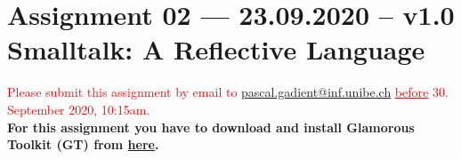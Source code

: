 \documentclass [11pt, a4wide, twoside]{article}
\begin{document}
\section*{Assignment 02  --- 23.09.2020 -- v1.0\\Smalltalk: A Reflective Language}

\textcolor{red}{Please submit this assignment by email to \href{mailto:pascal.gadient@inf.unibe.ch}{pascal.gadient@inf.unibe.ch} \underline{before} 30. September 2020, 10:15am.}\\

\noindent \textbf{For this assignment you have to download and install Glamorous Toolkit (GT) from \href{https://gtoolkit.com/}{here}.}
\end{document}
